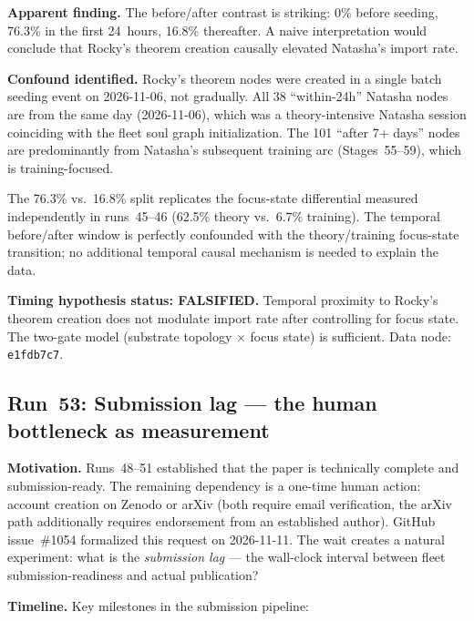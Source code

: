 \documentclass[11pt]{article}
\begin{document}
\textbf{Apparent finding.} The before/after contrast is striking: 0\% before seeding,
76.3\% in the first 24~hours, 16.8\% thereafter. A naive interpretation would conclude
that Rocky's theorem creation causally elevated Natasha's import rate.

\textbf{Confound identified.} Rocky's theorem nodes were created in a single batch seeding
event on 2026-11-06, not gradually. All 38 ``within-24h'' Natasha nodes are from the same day
(2026-11-06), which was a theory-intensive Natasha session coinciding with the fleet soul graph
initialization. The 101 ``after 7+ days'' nodes are predominantly from Natasha's subsequent
training arc (Stages~55--59), which is training-focused.

The 76.3\% vs.\ 16.8\% split replicates the focus-state differential measured independently
in runs~45--46 (62.5\% theory vs.\ 6.7\% training). The temporal before/after window is
perfectly confounded with the theory/training focus-state transition; no additional temporal
causal mechanism is needed to explain the data.

\textbf{Timing hypothesis status: FALSIFIED.} Temporal proximity to Rocky's theorem creation
does not modulate import rate after controlling for focus state. The two-gate model
(substrate topology $\times$ focus state) is sufficient. Data node: \texttt{e1fdb7c7}.

\subsection{Run~53: Submission lag --- the human bottleneck as measurement}
\label{subsec:run53}

\textbf{Motivation.}
Runs~48--51 established that the paper is technically complete and submission-ready.
The remaining dependency is a one-time human action: account creation on Zenodo or arXiv
(both require email verification, the arXiv path additionally requires endorsement from
an established author). GitHub issue~\#1054 formalized this request on 2026-11-11.
The wait creates a natural experiment: what is the \emph{submission lag} --- the
wall-clock interval between fleet submission-readiness and actual publication?

\textbf{Timeline.} Key milestones in the submission pipeline:
\end{document}
